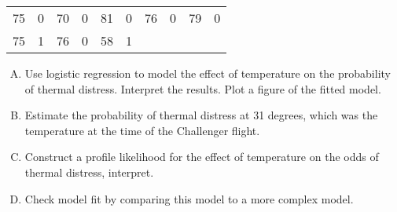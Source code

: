 \documentclass[12pt]{article}
\begin{document}
\begin{enumerate}
\begin{center}
\begin{tabular}{cc|cc|cc|cc|cc}
    75 & 0 & 70 & 0 & 81 & 0 & 76 & 0 & 79 & 0 \\
    75 & 1 & 76 & 0 & 58 & 1 &    &   &    &   \\ \hline
  \end{tabular}
\end{center}
\begin{enumerate}[A.]
\item Use logistic regression to model the effect of temperature on the probability
  of thermal distress. Interpret the results. Plot a figure of the fitted model.
\item Estimate the probability of thermal distress at 31 degrees, which was the
  temperature at the time of the Challenger flight.
\item Construct a profile likelihood for the effect of temperature on the odds
  of thermal distress, interpret.
\item Check model fit by comparing this model to a more complex model.
\end{enumerate}
\end{enumerate}
\end{document}
